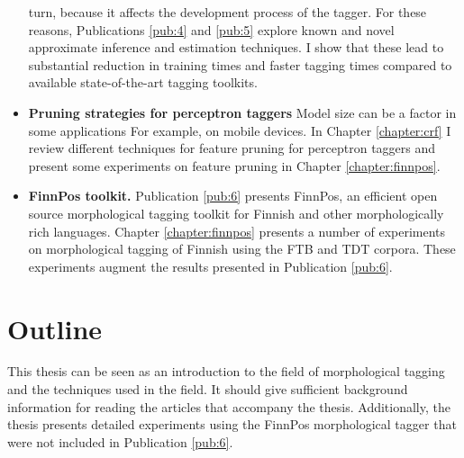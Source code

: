 \begin{itemize}
  turn, because it affects the development process of the tagger. For
  these reasons, Publications \ref{pub:4} and \ref{pub:5}
  explore known and novel approximate inference and estimation
  techniques. I show that these lead to substantial reduction in
  training times and faster tagging times compared to available
  state-of-the-art tagging toolkits.
\item {\bf Pruning strategies for perceptron taggers} Model size can
  be a factor in some applications For example, on mobile devices. In
  Chapter \ref{chapter:crf} I review different techniques for feature
  pruning for perceptron taggers and present some experiments on
  feature pruning in Chapter \ref{chapter:finnpos}.
\item {\bf FinnPos toolkit.} Publication \ref{pub:6} presents FinnPos,
  an efficient open source morphological tagging toolkit for Finnish
  and other morphologically rich languages. Chapter
  \ref{chapter:finnpos} presents a number of experiments on
  morphological tagging of Finnish using the FTB and TDT
  corpora. These experiments augment the results presented in
  Publication \ref{pub:6}.
\end{itemize}


\section{Outline}
This thesis can be seen as an introduction to the field of
morphological tagging and the techniques used in the field. It should
give sufficient background information for reading the articles that
accompany the thesis. Additionally, the thesis presents detailed
experiments using the FinnPos morphological tagger that were not
included in Publication \ref{pub:6}.

